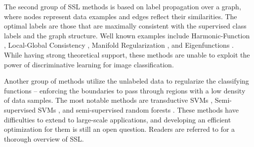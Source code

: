 \documentclass[preprint,12pt,3p]{elsarticle}
\begin{document}
The second group of SSL methods is based on label propagation over a
graph, where nodes represent data examples and edges reflect their
similarities. The optimal labels are those that are maximally
consistent with the supervised class labels and the graph
structure. Well known examples include Harmonic-Function
\citep{Zhu:Harmonic:03}, Local-Global Consistency \citep{Zhou:nips:04},
Manifold Regularization \citep{Belkin:semiframe:2006}, and
Eigenfunctions \citep{Fergus09}. While having strong theoretical
support, these methods are unable to exploit the power of
discriminative learning for image classification.

Another group of methods utilize the unlabeled data to regularize the
classifying functions -- enforcing the boundaries to pass through
regions with a low density of data samples. The most notable methods
are transductive SVMs \citep{Joachims:1999}, Semi-supervised
SVMs \citep{SemiSVM}, and semi-supervised random
forests \citep{SemiForest}. These methods have difficulties to extend to
large-scale applications, and developing an efficient optimization for
them is still an open question.  Readers are referred
to \citep{Zhu:ISL:2009} for a thorough overview of SSL.



\end{document}
